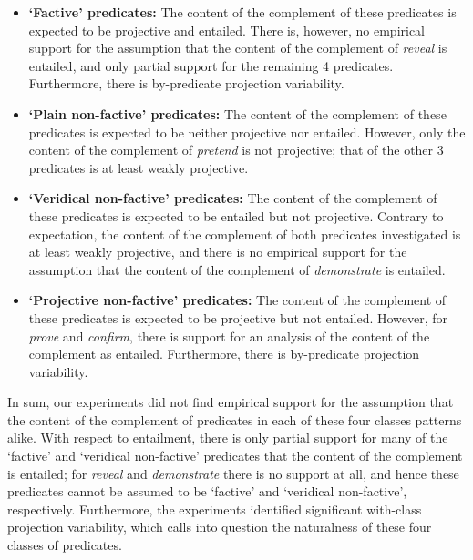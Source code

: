 \documentclass[11pt,fleqn]{article}
\newcommand{\6}{\mbox{$[\hspace*{-.6mm}[$}}
\newcommand{\9}{\mbox{$]\hspace*{-.6mm}]$}}
\begin{document}
{\begin{itemize}[topsep=-1pt,itemsep=1pt]

\item {\bf `Factive' predicates:} The content of the complement of these predicates is expected to be projective and entailed. There is, however, no empirical support for the assumption that the content of the complement of {\em reveal} is entailed, and only partial support for the remaining 4 predicates. Furthermore, there is by-predicate projection variability.

\item {\bf `Plain non-factive' predicates:} The content of the complement of these predicates is expected to be neither projective nor entailed. However, only the content of the complement of {\em pretend} is not projective; that of the other 3 predicates is at least weakly projective.

\item {\bf `Veridical non-factive' predicates:} The content of the complement of these predicates is expected to be entailed but not projective. Contrary to expectation, the content of the complement of both predicates investigated is at least weakly projective, and there is no empirical support for the assumption that the content of the complement of {\em demonstrate} is entailed. 

\item {\bf `Projective non-factive' predicates:} The content of the complement of these predicates is expected to be projective but not entailed. However, for {\em prove} and {\em confirm}, there is support for an analysis of the content of the complement as entailed. Furthermore, there is by-predicate projection variability.

\end{itemize}

In sum, our experiments did not find empirical support for the assumption that the content of the complement of predicates in each of these four classes patterns alike. With respect to entailment, there is only partial support for many of the `factive' and `veridical non-factive' predicates that the content of the complement is entailed; for {\em reveal} and {\em demonstrate} there is no support at all, and hence these predicates cannot be assumed to be `factive' and `veridical non-factive', respectively. Furthermore, the experiments identified significant with-class projection variability, which calls into question the naturalness of these four classes of predicates. 

}
\end{document}
